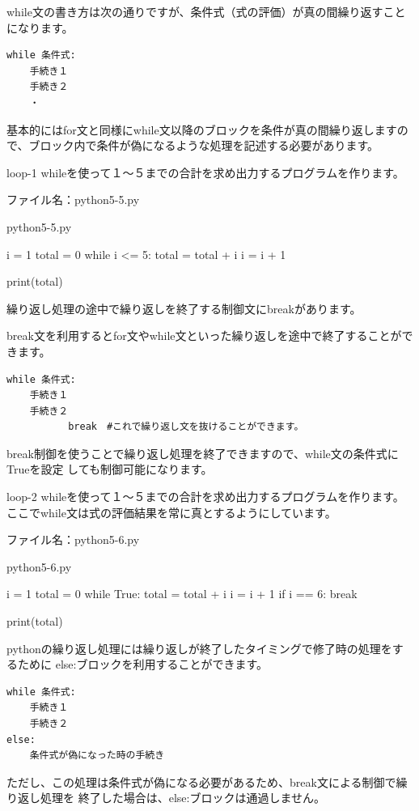 \documentclass[11pt,a4paper,dvipdfmx,titlepage]{jsreport}
\begin{document}
while文の書き方は次の通りですが、条件式（式の評価）が真の間繰り返すことになります。
\begin{verbatim}
while 条件式:
    手続き１
    手続き２
    ・
\end{verbatim}
基本的にはfor文と同様にwhile文以降のブロックを条件が真の間繰り返しますので、ブロック内で条件が偽になるような処理を記述する必要があります。
\begin{pabox}{loop-1}
whileを使って１～５までの合計を求め出力するプログラムを作ります。

ファイル名：python5-5.py
\begin{codebox}{python5-5.py}
\begin{listing}{1}
i = 1
total = 0
while i <= 5:
    total = total + i
    i = i + 1

print(total)
\end{listing}
\end{codebox}
\end{pabox}
繰り返し処理の途中で繰り返しを終了する制御文にbreakがあります。

break文を利用するとfor文やwhile文といった繰り返しを途中で終了することができます。

\begin{verbatim}
while 条件式:
    手続き１
    手続き２
    　　　　break　#これで繰り返し文を抜けることができます。
\end{verbatim}

break制御を使うことで繰り返し処理を終了できますので、while文の条件式にTrueを設定
しても制御可能になります。
\begin{pabox}{loop-2}
whileを使って１～５までの合計を求め出力するプログラムを作ります。
ここでwhile文は式の評価結果を常に真とするようにしています。

ファイル名：python5-6.py
\begin{codebox}{python5-6.py}
\begin{listing}{1}
i = 1
total = 0
while True:
    total = total + i
    i = i + 1
    if i == 6:
        break

print(total)
\end{listing}
\end{codebox}
\end{pabox}

pythonの繰り返し処理には繰り返しが終了したタイミングで修了時の処理をするために
else:ブロックを利用することができます。

\begin{verbatim}
while 条件式:
    手続き１
    手続き２
else:
    条件式が偽になった時の手続き
\end{verbatim}
ただし、この処理は条件式が偽になる必要があるため、break文による制御で繰り返し処理を
終了した場合は、else:ブロックは通過しません。
\end{document}
